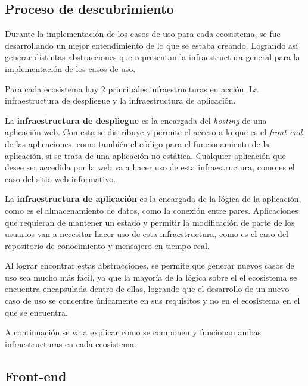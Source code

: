 \subsection{Proceso de descubrimiento}

Durante la implementación de los casos de uso para cada ecosistema, se fue desarrollando un mejor entendimiento de lo que se estaba creando. Logrando así generar distintas abstracciones que representan la infraestructura general para la implementación de los casos de uso.

Para cada ecosistema hay 2 principales infraestructuras en acción. La infraestructura de despliegue y la infraestructura de aplicación.

La \textbf{infraestructura de despliegue} es la encargada del \textit{hosting} de una aplicación web. Con esta se distribuye y permite el acceso a lo que es el \textit{front-end} de las aplicaciones, como también el código para el funcionamiento de la aplicación, si se trata de una aplicación no estática. Cualquier aplicación que desee ser accedida por la web va a hacer uso de esta infraestructura, como es el caso del sitio web informativo.

La \textbf{infraestructura de aplicación} es la encargada de la lógica de la aplicación, como es el almacenamiento de datos, como la conexión entre pares. Aplicaciones que requieran de mantener un estado y permitir la modificación de parte de los usuarios van a necesitar hacer uso de esta infraestructura, como es el caso del repositorio de conocimiento y mensajero en tiempo real.

Al lograr encontrar estas abstracciones, se permite que generar nuevos casos de uso sea mucho más fácil, ya que la mayoría de la lógica sobre el el ecosistema se encuentra encapsulada dentro de ellas, logrando que el desarrollo de un nuevo caso de uso se concentre únicamente en sus requisitos y no en el ecosistema en el que se encuentra.

A continuación se va a explicar como se componen y funcionan ambas infraestructuras en cada ecosistema.







\subsection{Front-end}

